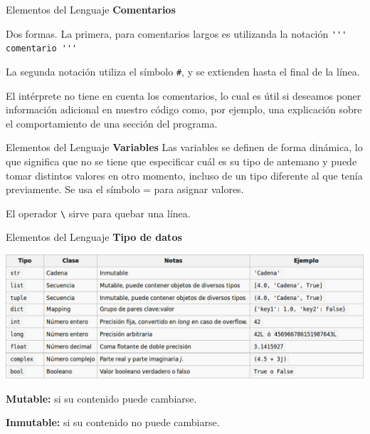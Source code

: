 \documentclass[handout,hyperref={colorlinks=true}]{beamer}
\begin{document}
\begin{frame}[fragile]{Elementos del Lenguaje}
\textbf{Comentarios}

Dos formas. La primera, para comentarios largos es utilizanda la notación \verb~''' comentario '''~

 La segunda notación utiliza el símbolo \verb~#~, y se extienden hasta el final de la línea.

El intérprete no tiene en cuenta los comentarios, lo cual es útil si deseamos poner información adicional en nuestro código como, por ejemplo, una explicación sobre el comportamiento de una sección del programa.

\lstI


\end{frame}



\begin{frame}[fragile]{Elementos del Lenguaje}
\textbf{Variables}
Las variables se definen de forma dinámica, lo que significa que no se tiene que especificar cuál es su tipo de antemano y puede tomar distintos valores en otro momento, incluso de un tipo diferente al que tenía previamente. Se usa el símbolo = para asignar valores.

\lstI

El operador \verb+\+ sirve para quebar una línea.

\end{frame}

\defverbatim[colored]

\begin{frame}[fragile]{Elementos del Lenguaje}
\textbf{Tipo de datos}

\includegraphics[scale=.4]{imagenes/tipo_datos.jpg}

  \textbf{Mutable:} si su contenido puede cambiarse.

    \textbf{Inmutable:} si su contenido no puede cambiarse.

\lstI

\end{frame}
\end{document}

